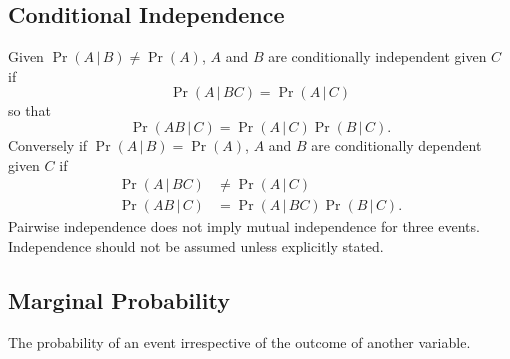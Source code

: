 \documentclass{article}
\begin{document}
\begin{multicols}{3}
    \subsection{Conditional Independence}
    Given \(\Pr{\left( A \,\vert\, B \right)} \neq \Pr{\left( A
    \right)}\), \(A\) and \(B\) are conditionally independent given
    \(C\) if
    \begin{equation*}
        \Pr{\left( A \,\vert\, BC \right)} = \Pr{\left( A \,\vert\, C \right)}
    \end{equation*}
    so that
    \begin{equation*}
        \Pr{\left( AB \,\vert\, C \right)} = \Pr{\left( A \,\vert\, C \right)} \Pr{\left( B \,\vert\, C \right)}.
    \end{equation*}
    Conversely if \(\Pr{\left( A \,\vert\, B \right)} = \Pr{\left( A \right)}\), \(A\) and \(B\) are conditionally dependent given \(C\) if
    \begin{align*}
        \Pr{\left( A \,\vert\, BC \right)} & \neq \Pr{\left( A \,\vert\, C \right)}                                  \\
        \Pr{\left( AB \,\vert\, C \right)} & = \Pr{\left( A \,\vert\, BC \right)} \Pr{\left( B \,\vert\, C \right)}.
    \end{align*}
    Pairwise independence does not imply mutual independence for three events.
    Independence should not be assumed unless explicitly stated.
    \subsection{Marginal Probability}
    The probability of an event irrespective of the outcome of another
    variable.

\end{multicols}
\end{document}
